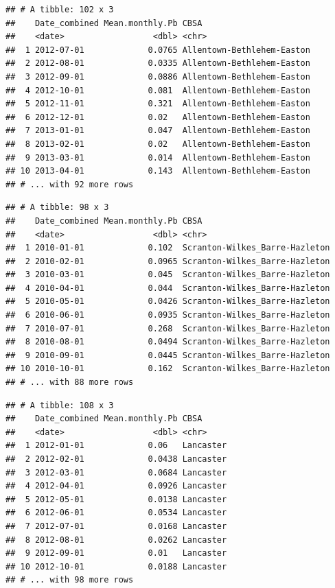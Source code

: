 \documentclass[
  12pt,
]{article}
\begin{document}
\begin{verbatim}
## # A tibble: 102 x 3
##    Date_combined Mean.monthly.Pb CBSA                      
##    <date>                  <dbl> <chr>                     
##  1 2012-07-01             0.0765 Allentown-Bethlehem-Easton
##  2 2012-08-01             0.0335 Allentown-Bethlehem-Easton
##  3 2012-09-01             0.0886 Allentown-Bethlehem-Easton
##  4 2012-10-01             0.081  Allentown-Bethlehem-Easton
##  5 2012-11-01             0.321  Allentown-Bethlehem-Easton
##  6 2012-12-01             0.02   Allentown-Bethlehem-Easton
##  7 2013-01-01             0.047  Allentown-Bethlehem-Easton
##  8 2013-02-01             0.02   Allentown-Bethlehem-Easton
##  9 2013-03-01             0.014  Allentown-Bethlehem-Easton
## 10 2013-04-01             0.143  Allentown-Bethlehem-Easton
## # ... with 92 more rows
\end{verbatim}

\begin{verbatim}
## # A tibble: 98 x 3
##    Date_combined Mean.monthly.Pb CBSA                          
##    <date>                  <dbl> <chr>                         
##  1 2010-01-01             0.102  Scranton-Wilkes_Barre-Hazleton
##  2 2010-02-01             0.0965 Scranton-Wilkes_Barre-Hazleton
##  3 2010-03-01             0.045  Scranton-Wilkes_Barre-Hazleton
##  4 2010-04-01             0.044  Scranton-Wilkes_Barre-Hazleton
##  5 2010-05-01             0.0426 Scranton-Wilkes_Barre-Hazleton
##  6 2010-06-01             0.0935 Scranton-Wilkes_Barre-Hazleton
##  7 2010-07-01             0.268  Scranton-Wilkes_Barre-Hazleton
##  8 2010-08-01             0.0494 Scranton-Wilkes_Barre-Hazleton
##  9 2010-09-01             0.0445 Scranton-Wilkes_Barre-Hazleton
## 10 2010-10-01             0.162  Scranton-Wilkes_Barre-Hazleton
## # ... with 88 more rows
\end{verbatim}

\begin{verbatim}
## # A tibble: 108 x 3
##    Date_combined Mean.monthly.Pb CBSA     
##    <date>                  <dbl> <chr>    
##  1 2012-01-01             0.06   Lancaster
##  2 2012-02-01             0.0438 Lancaster
##  3 2012-03-01             0.0684 Lancaster
##  4 2012-04-01             0.0926 Lancaster
##  5 2012-05-01             0.0138 Lancaster
##  6 2012-06-01             0.0534 Lancaster
##  7 2012-07-01             0.0168 Lancaster
##  8 2012-08-01             0.0262 Lancaster
##  9 2012-09-01             0.01   Lancaster
## 10 2012-10-01             0.0188 Lancaster
## # ... with 98 more rows
\end{verbatim}
\end{document}
